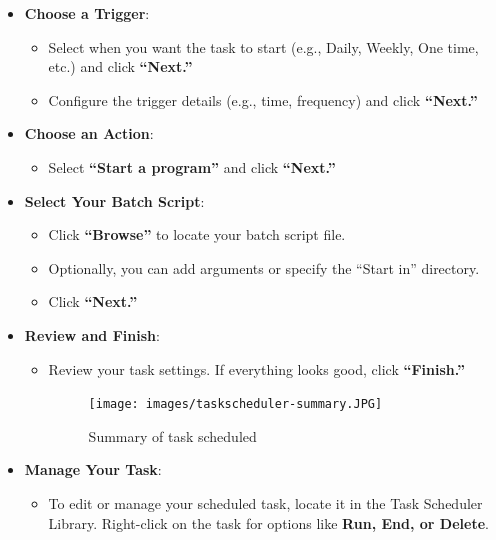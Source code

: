 \documentclass[
  letterpaper,
  DIV=11,
  numbers=noendperiod]{scrreprt}
\providecommand{\tightlist}{%
  \setlength{\itemsep}{0pt}\setlength{\parskip}{0pt}}\usepackage{longtable,booktabs,array}
\begin{document}
\begin{itemize}
\begin{itemize}
\begin{figure}[H]
    \end{figure}%
  \end{itemize}
\item
  \textbf{Choose a Trigger}:

  \begin{itemize}
  \item
    Select when you want the task to start (e.g., Daily, Weekly, One
    time, etc.) and click \textbf{``Next.''}
  \item
    Configure the trigger details (e.g., time, frequency) and click
    \textbf{``Next.''}
  \end{itemize}
\item
  \textbf{Choose an Action}:

  \begin{itemize}
  \tightlist
  \item
    Select \textbf{``Start a program''} and click \textbf{``Next.''}
  \end{itemize}
\item
  \textbf{Select Your Batch Script}:

  \begin{itemize}
  \item
    Click \textbf{``Browse''} to locate your batch script file.
  \item
    Optionally, you can add arguments or specify the ``Start in''
    directory.
  \item
    Click \textbf{``Next.''}
  \end{itemize}
\item
  \textbf{Review and Finish}:

  \begin{itemize}
  \item
    Review your task settings. If everything looks good, click
    \textbf{``Finish.''}

    \begin{figure}[H]

    {\centering \texttt{[image: images/taskscheduler-summary.JPG]}

    }

    \caption{Summary of task scheduled}

    \end{figure}%
  \end{itemize}
\item
  \textbf{Manage Your Task}:

  \begin{itemize}
  \tightlist
  \item
    To edit or manage your scheduled task, locate it in the Task
    Scheduler Library. Right-click on the task for options like
    \textbf{Run, End, or Delete}.
  \end{itemize}
\end{itemize}
\end{document}
